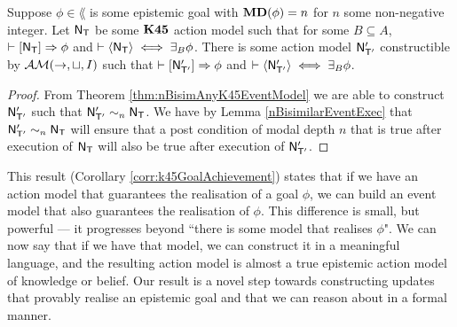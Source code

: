 \begin{corr} \label{corr:k45GoalAchievement}
  Suppose $\phi \in \lang$ is some epistemic goal with ${\bf MD}(\phi) = n$ for $n$
  some non-negative integer.
  Let $\mathrm{\mathsf{N}}_\mathrm{\mathsf{T}}$ be some $\bf K45$ action model such that for some $B
  \subseteq A$, $\vdash [{\mathrm{\mathsf{N}}_\mathrm{\mathsf{T}}}] \Rightarrow \phi$ and $\vdash
  \langle { \ensuremath {\mathrm{\mathsf{N}}} _ \ensuremath {\mathrm{\mathsf{T}}} } \rangle \iff \exists_B \phi$.
  There is some action model $\mathrm{\mathsf{N}}'_{\mathrm{\mathsf{T}}'}$ constructible by $\mathcal{AM}(\to,\sqcup,I)$
  such that $\vdash [{\mathrm{\mathsf{N}}'_{\mathrm{\mathsf{T}}'}}] \Rightarrow \phi$ and $\vdash
  \langle { \ensuremath {\mathrm{\mathsf{N}}} '_{ \ensuremath {\mathrm{\mathsf{T}}} '}} \rangle \iff \exists_B \phi$.
\end{corr}
\begin{proof}
  From Theorem \ref{thm:nBisimAnyK45EventModel} we are able to construct
  $\mathrm{\mathsf{N}}'_{\mathrm{\mathsf{T}}'}$ such that $\mathrm{\mathsf{N}}'_{\mathrm{\mathsf{T}}'} \sim_n \mathrm{\mathsf{N}}_\mathrm{\mathsf{T}}$.
  We have by Lemma \ref{nBisimilarEventExec} that $\mathrm{\mathsf{N}}'_{\mathrm{\mathsf{T}}'} \sim_n
  \mathrm{\mathsf{N}}_\mathrm{\mathsf{T}}$ will ensure that a post condition of modal depth $n$ that is true
  after execution of $\mathrm{\mathsf{N}}_\mathrm{\mathsf{T}}$ will also be true after execution of
  $\mathrm{\mathsf{N}}'_{\mathrm{\mathsf{T}}'}$.
\end{proof}

This result (Corollary \ref{corr:k45GoalAchievement}) states
that if we have an action model that guarantees the realisation of a goal $\phi$, we can build an event
model that also guarantees the realisation of $\phi$.
This difference is small, but powerful --- it progresses beyond ``there is some model that realises
$\phi$".
We can now say that if we have that model, we can construct it in a meaningful language, and the
resulting action model is almost a true epistemic action model of knowledge or belief.
Our result is a novel step towards constructing updates that provably realise an epistemic goal and
that we can reason about in a formal manner.
